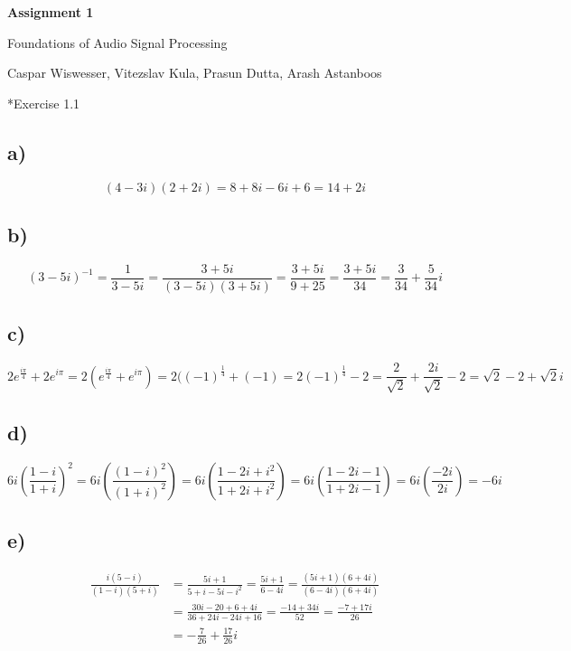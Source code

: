 \documentclass{article} %
\newcommand{\maketitletwo}[2][]{\begin{center}
        \Large{\textbf{Assignment #1}
            
            Foundations of Audio Signal Processing} %
        \vspace{5pt}
        
        \normalsize{Caspar Wiswesser, Vitezslav Kula, Prasun Dutta, Arash Astanboos %
        }
        \vspace{15pt}
        
\end{center}}
\begin{document}
    \maketitletwo[1]  %
    
    \section*{Exercise 1.1}
    \subsection*{a)}
    \begin{equation*}
        (4-3i)(2+2i) = 8 + 8i - 6i + 6 = 14 + 2i
    \end{equation*}
    
    \subsection*{b)}
    \begin{equation*}
        (3-5i)^{-1} = \frac{1}{3-5i} = \frac{3+5i}{(3-5i)(3+5i)} = \frac{3+5i}{9+25} = \frac{3+5i}{34} = \frac{3}{34} + \frac{5}{34}i
    \end{equation*}

    \subsection*{c)}
    \begin{equation*}
        2e^{\frac{i\pi}{4}} + 2e^{i\pi} = 2 ( e^{\frac{i\pi}{4}} + e^{i\pi} ) = 2 ((-1)^{\frac{1}{4}} + (-1) = 2(-1)^{\frac{1}{4}} - 2 = \frac{2}{\sqrt{2}} + \frac{2i}{\sqrt{2}} - 2 = \sqrt{2} - 2 + \sqrt{2}i
    \end{equation*}

    \subsection*{d)}
    \begin{equation*}
        6i \left(\frac{1-i}{1+i}\right)^2 = 6i \left(\frac{(1-i)^2}{(1+i)^2}\right) = 6i \left(\frac{1-2i+i^2}{1+2i+i^2}\right) = 6i \left(\frac{1-2i-1}{1+2i-1}\right) = 6i \left(\frac{-2i}{2i}\right) = -6i
    \end{equation*}

    \subsection*{e)}
    \begin{align*}
        \frac{i(5-i)}{(1-i)(5+i)} &= \frac{5i+1}{5+i-5i-i^2} = \frac{5i+1}{6-4i} = \frac{(5i+1)(6+4i)}{(6-4i)(6+4i)} \\ 
        &= \frac{30i-20+6+4i}{36+24i-24i+16} = \frac{-14+34i}{52} = \frac{-7+17i}{26} \\
        &= -\frac{7}{26} + \frac{17}{26}i
    \end{align*}
        
\end{document}
